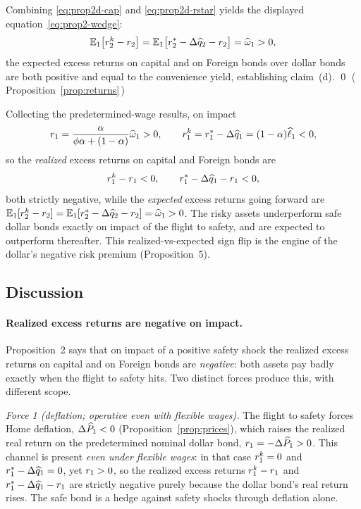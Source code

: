 \medskip
Combining \eqref{eq:prop2d-cap} and \eqref{eq:prop2d-rstar} yields the displayed
equation~\eqref{eq:prop2-wedge}:
\[
\mathbb{E}_1\bigl[r^{k}_2-r_2\bigr]
=\mathbb{E}_1\bigl[r^{*}_2-\Delta\widehat{q}_2-r_2\bigr]=\widehat{\omega}_1>0,
\]
the expected excess returns on capital and on Foreign bonds over dollar bonds are
both positive and equal to the convenience yield, establishing claim~(d). \qed
(\,Proposition~\ref{prop:returns}\,)

\begin{remark}
Collecting the predetermined-wage results, on impact
\[
r_1 = \frac{\alpha}{\phi\alpha+(1-\alpha)}\widehat{\omega}_1 > 0,
\qquad
r^{k}_1 = r^{*}_1-\Delta\widehat{q}_1 = (1-\alpha)\widehat{\ell}_1 < 0,
\]
so the \emph{realized} excess returns on capital and Foreign bonds are
\[
r^{k}_1-r_1 < 0,
\qquad
r^{*}_1-\Delta\widehat{q}_1-r_1 < 0,
\]
both strictly negative, while the \emph{expected} excess returns going forward
are $\mathbb{E}_1[r^{k}_2-r_2]=\mathbb{E}_1[r^{*}_2-\Delta\widehat{q}_2-r_2]=\widehat{\omega}_1>0$. The
risky assets underperform safe dollar bonds exactly on impact of the flight to
safety, and are expected to outperform thereafter. This realized-vs-expected sign
flip is the engine of the dollar's negative risk premium (Proposition~5).
\end{remark}

\subsection{Discussion}

\paragraph{Realized excess returns are negative on impact.} Proposition~2 says
that on impact of a positive safety shock the realized excess returns on capital
and on Foreign bonds are \emph{negative}: both assets pay badly exactly when the
flight to safety hits. Two distinct forces produce this, with different scope.

\emph{Force 1 (deflation; operative even with flexible wages).} The flight to
safety forces Home deflation, $\Delta\widehat{P}_1<0$ (Proposition~\ref{prop:prices}),
which raises the realized real return on the predetermined nominal dollar bond,
$r_1=-\Delta\widehat{P}_1>0$. This channel is present \emph{even under flexible wages}:
in that case $r^{k}_1=0$ and $r^{*}_1-\Delta\widehat{q}_1=0$, yet $r_1>0$, so the
realized excess returns $r^{k}_1-r_1$ and $r^{*}_1-\Delta\widehat{q}_1-r_1$ are
strictly negative purely because the dollar bond's real return rises. The safe
bond is a hedge against safety shocks through deflation alone.

